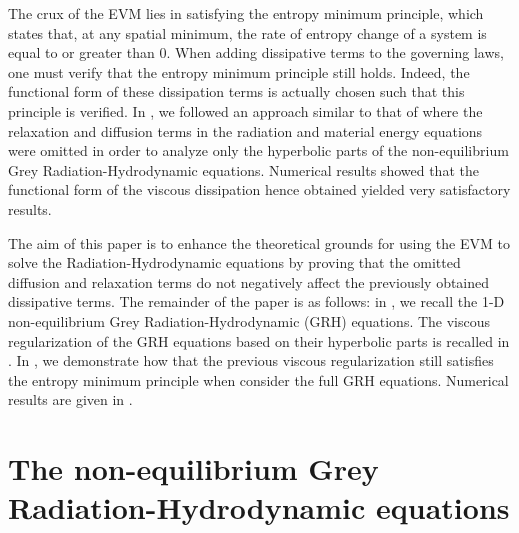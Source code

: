 \documentclass{mc2015}
\begin{document}
The crux of the EVM lies in satisfying the entropy minimum principle, which states that, at any spatial minimum, the rate of entropy change of a system is equal to or greater than 0. When
adding dissipative terms to the governing laws, one must verify that the entropy minimum principle still holds. Indeed, the functional form of these dissipation terms
is actually chosen such that this principle is verified. In \cite{our_jcp_radhy_paper}, we followed an approach similar to that of \cite{Balsara, LowrieMorel} 
where the relaxation and diffusion terms in the radiation and material energy equations were omitted in order to analyze only the hyperbolic parts of 
the non-equilibrium Grey Radiation-Hydrodynamic equations. Numerical results showed that the functional form of the viscous dissipation hence obtained 
yielded very satisfactory results. 

The aim of this paper is to enhance the theoretical grounds for using the EVM to solve the  Radiation-Hydrodynamic equations by proving that the omitted diffusion
and relaxation terms do not negatively affect the previously obtained dissipative terms. The remainder of the paper is as follows: in , we recall
the 1-D non-equilibrium Grey Radiation-Hydrodynamic (GRH) equations. The viscous regularization of the GRH equations based on their hyperbolic parts is recalled in .
In , we demonstrate how that the previous viscous regularization still satisfies the entropy minimum principle when consider the full GRH equations.
Numerical results are given in . 

\section{The non-equilibrium Grey Radiation-Hydrodynamic equations}\label{sec:GRH}
\end{document}
